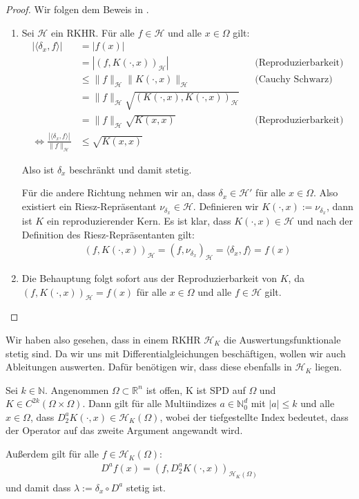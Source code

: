\begin{proof}
Wir folgen dem Beweis in \textcite[Proposition 3.8]{Santin.2017}.
\begin{enumerate}
\item 
Sei $\mathcal{H}$ ein \ac{RKHR}. Für alle $f \in \mathcal{H}$ und alle $x \in \Omega$ gilt:
\begin{align*}
|\langle \delta_x,f \rangle | &= |f(x)|\\ 
&= |(f, K(\cdot,x))_\mathcal{H}| &&\text{(Reproduzierbarkeit)}\\
&\le \|f\|_\mathcal{H}\|K(\cdot,x)\|_\mathcal{H} &&\text{(Cauchy Schwarz)}\\
&= \|f\|_\mathcal{H} \sqrt{(K(\cdot,x),K(\cdot,x))_\mathcal{H}}\\
&= \|f\|_\mathcal{H} \sqrt{K(x,x)} &&\text{(Reproduzierbarkeit)}\\
\Leftrightarrow \frac{|\langle \delta_x,f \rangle|}{\|f\|_\mathcal{H}} &\le \sqrt{K(x,x)}
\end{align*}

Also ist $\delta_x$ beschränkt und damit stetig.

Für die andere Richtung nehmen wir an, dass $\delta_x  \in \mathcal{H}'$ für alle $x \in \Omega$. Also existiert ein Riesz-Repräsentant $\nu_{\delta_x} \in \mathcal{H}$. Definieren wir $K(\cdot,x):= \nu_{\delta_x}$, dann ist $K$ ein reproduzierender Kern. Es ist klar, dass $K(\cdot,x) \in \mathcal{H}$ und nach der Definition des Riesz-Repräsentanten gilt:
\begin{align*}
(f, K(\cdot,x))_\mathcal{H} = (f, \nu_{\delta_x})_\mathcal{H} = \langle \delta_x,f \rangle = f(x)
\end{align*}
\item Die Behauptung folgt sofort aus der Reproduzierbarkeit von $K$, da $(f, K(\cdot,x))_\mathcal{H}= f(x)$ für alle $x \in \Omega$ und alle $f \in \mathcal{H}$ gilt.
\end{enumerate}
\end{proof}

Wir haben also gesehen, dass in einem \ac{RKHR} $\mathcal{H}_K$ die Auswertungsfunktionale stetig sind. Da wir uns mit Differentialgleichungen beschäftigen, wollen wir auch Ableitungen auswerten. Dafür benötigen wir, dass diese ebenfalls in $\mathcal{H}_K$ liegen.

\begin{theorem}
Sei $k \in \mathbb{N}$. Angenommen $\Omega \subset \mathbb{R}^n$ ist offen, K ist \ac{SPD} auf $\Omega$ und $K \in C^{2k}(\Omega \times \Omega)$. Dann gilt für alle Multiindizes $a \in \mathbb{N}_0^d$ mit $|a| \le k$ und alle $x \in \Omega$, dass $D_2^a K(\cdot , x) \in \mathcal{H}_K(\Omega)$, wobei der tiefgestellte Index bedeutet, dass der Operator auf das zweite Argument angewandt wird.

Außerdem gilt für alle $f \in \mathcal{H}_K(\Omega)$:
\begin{align*}
D^a f(x) = \left(f,D_2^a K(\cdot,x)\right)_{\mathcal{H}_K(\Omega)}
\end{align*}
und damit dass $\lambda := \delta_x \circ D^a$ stetig ist.
\end{theorem}

